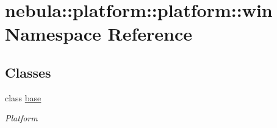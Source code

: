\hypertarget{namespacenebula_1_1platform_1_1platform_1_1win}{
\section{nebula::platform::platform::win Namespace Reference}
\label{namespacenebula_1_1platform_1_1platform_1_1win}
}
\subsection*{Classes}
\begin{DoxyCompactItemize}
\item 
class \hyperlink{classnebula_1_1platform_1_1platform_1_1win_1_1base}{base}
\begin{DoxyCompactList}\small\item\em Platform \item\end{DoxyCompactList}\end{DoxyCompactItemize}
